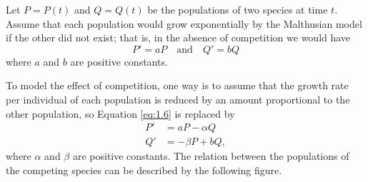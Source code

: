 \begin{example}
  Let $P=P(t)$ and $Q=Q(t)$ be the populations of two species at time $t$. Assume that each population would grow exponentially by the Malthusian model if the other did not exist; that is, in the absence of competition we would have
  \begin{equation}
    P'=aP \quad \text{and} \quad Q'=bQ \label{eq:1.6}
  \end{equation}
  where $a$ and $b$ are positive constants.

  To model the effect of competition, one way is to assume that the growth rate per individual of each population is reduced by an amount proportional to the other population, so Equation \ref{eq:1.6} is replaced by
  \begin{align*}
    P' & = aP-\alpha Q  \\
    Q' & = -\beta P+bQ,
  \end{align*}
  where $\alpha$ and $\beta$ are positive constants.
  The relation between the populations of the competing species can be described by the following figure.
  \begin{figure}[hbt!]
    \centering



\end{figure}
\end{example}
